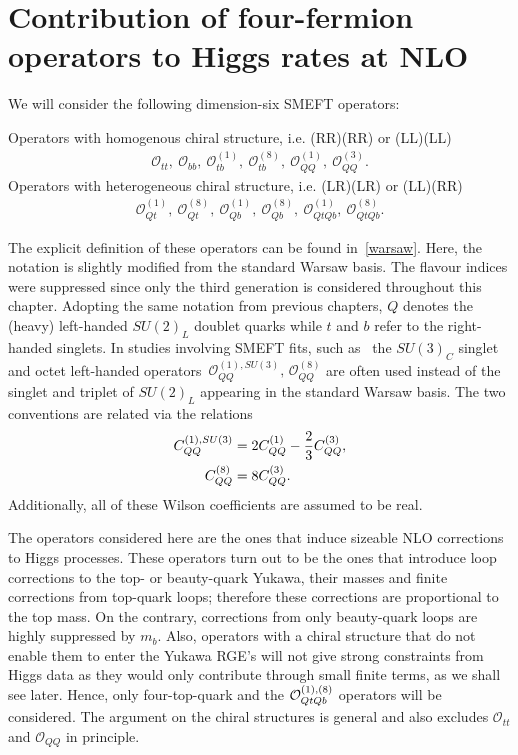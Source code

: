 \section{Contribution of four-fermion operators to Higgs rates at NLO \label{sec:HiggsCalc}}
We will consider the following dimension-six SMEFT operators:
%
\begin{tcolorbox}[title=Four-heavy-quark SMEFT operators modifying Higgs rates at NLO,
	title filled=false,
	colback=Mahogany!5!white,
	colframe=Mahogany ]
	Operators with homogenous chiral structure, i.e.  (RR)(RR) or (LL)(LL)
	\begin{align}
		\mathcal{O}_{tt},\  \mathcal{O}_{bb},\ \mathcal{O}_{tb}^{(1)}, \ \mathcal{O}_{tb}^{(8)}, \  \mathcal{O}_{QQ}^{(1)},\   \mathcal{O}_{QQ}^{(3)}.
		\label{box:heavyq}
	\end{align}
	Operators with heterogeneous chiral structure, i.e.  (LR)(LR) or (LL)(RR)
	\begin{align}
		\mathcal{O}_{Qt}^{(1)},\ \mathcal{O}_{Qt}^{(8)},\ \mathcal{O}_{Qb}^{(1)},\ \mathcal{O}_{Qb}^{(8)},\ \mathcal{O}^{(1)}_{QtQb},\ \mathcal{O}^{(8)}_{QtQb}.
		\label{box:heavyqs}
	\end{align}
\end{tcolorbox}
The explicit definition of these operators can be found in~\autoref{warsaw}. Here, the notation is slightly modified from the standard Warsaw basis. The flavour indices were suppressed since only the third generation is considered throughout this chapter. Adopting the same notation from previous chapters, $Q$ denotes the (heavy) left-handed  $SU(2)_L$ doublet quarks while  $t$ and $b$ refer to the right-handed singlets.  In studies involving SMEFT fits, such as~\cite{Ethier:2021bye} the $SU(3)_C$ singlet and octet left-handed operators~$\mathcal{O}_{QQ}^{(1),SU(3)},\,\mathcal{O}_{QQ}^{(8)}$ are often used instead of the singlet and triplet of $SU(2)_L$ appearing in the standard Warsaw basis. The two conventions are related via the relations
\begin{align}
	C_{QQ}^{(1),SU(3)} &= 2 C_{QQ}^{(1)} -\frac{2}{3} C_{QQ}^{(3)}, \nonumber \\
	C_{QQ}^{(8)} &= 8 C_{QQ}^{(3)}.
\end{align}
Additionally, all of these Wilson coefficients are assumed to be real.
\par  The operators considered here are the ones that induce sizeable NLO corrections to Higgs processes. These operators turn out to be the ones that introduce loop corrections to the top- or beauty-quark Yukawa, their masses and finite corrections from top-quark loops; therefore these corrections are proportional to the top mass. On the contrary, corrections from only beauty-quark loops are highly suppressed by $m_b$.  Also, operators with a chiral structure that do not enable them to enter the Yukawa RGE's will not give strong constraints from Higgs data as they would only contribute through small finite terms, as we shall see later.  Hence, only four-top-quark and the  ${\cal O}_{QtQb}^{(1),(8)}$ operators will be considered. The argument on the chiral structures is general and also excludes $\mathcal{O}_{tt}$ and $\mathcal{O}_{QQ}$ in principle.
